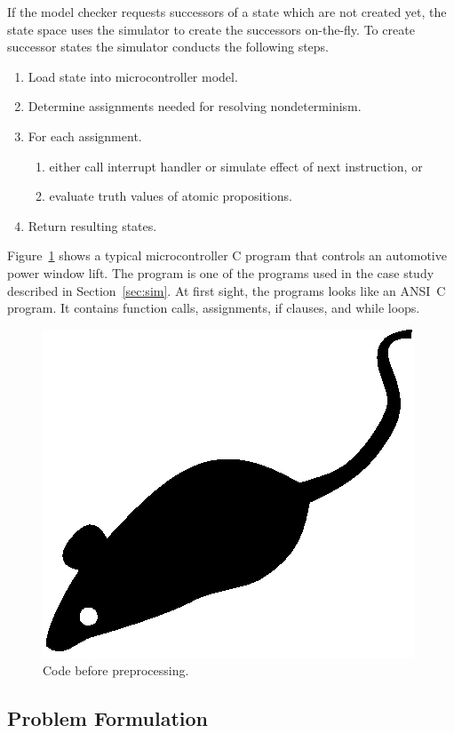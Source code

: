 \documentclass[prodmode,acmtecs]{acmsmall} %
\begin{document}
If the model checker requests successors of a state which are not
created yet, the state space uses the simulator to create the
successors on-the-fly. To create successor states the simulator
conducts the following steps.
\begin{enumerate}
\item Load state into microcontroller model.
\item Determine assignments needed for resolving nondeterminism.
\item For each assignment.
      \begin{enumerate}
      \item either call interrupt handler or simulate effect of next instruction, or
      \item evaluate truth values of atomic propositions.
      \end{enumerate}
\item Return resulting states.
\end{enumerate}
Figure~\ref{fig:one} shows a typical microcontroller C program that
controls an automotive power window lift. The program is one of the
programs used in the case study described in Section~\ref{sec:sim}.
At first sight, the programs looks like an ANSI~C program. It
contains function calls, assignments, if clauses, and while loops.
\begin{figure}
\centerline{\includegraphics{acmsmall-mouse}}
\caption{Code before preprocessing.}
\label{fig:one}
\end{figure}

\subsection{Problem Formulation}
\end{document}
